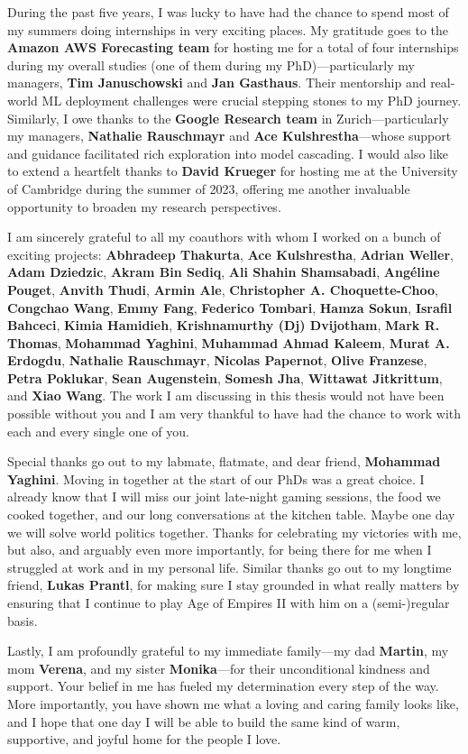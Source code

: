 During the past five years, I was lucky to have had the chance to spend most of my summers doing internships in very exciting places. My gratitude goes to the \textbf{Amazon AWS Forecasting team} for hosting me for a total of four internships during my overall studies (one of them during my PhD)—particularly my managers, \textbf{Tim Januschowski} and \textbf{Jan Gasthaus}. Their mentorship and real-world ML deployment challenges were crucial stepping stones to my PhD journey. Similarly, I owe thanks to the \textbf{Google Research team} in Zurich—particularly my managers, \textbf{Nathalie Rauschmayr} and \textbf{Ace Kulshrestha}—whose support and guidance facilitated rich exploration into model cascading. I would also like to extend a heartfelt thanks to \textbf{David Krueger} for hosting me at the University of Cambridge during the summer of 2023, offering me another invaluable opportunity to broaden my research perspectives.

I am sincerely grateful to all my coauthors with whom I worked on a bunch of exciting projects: \textbf{Abhradeep Thakurta}, \textbf{Ace Kulshrestha}, \textbf{Adrian Weller}, \textbf{Adam Dziedzic}, \textbf{Akram Bin Sediq}, \textbf{Ali Shahin Shamsabadi}, \textbf{Angéline Pouget}, \textbf{Anvith Thudi}, \textbf{Armin Ale}, \textbf{Christopher A. Choquette-Choo}, \textbf{Congchao Wang}, \textbf{Emmy Fang}, \textbf{Federico Tombari}, \textbf{Hamza Sokun}, \textbf{Israfil Bahceci}, \textbf{Kimia Hamidieh}, \textbf{Krishnamurthy (Dj) Dvijotham}, \textbf{Mark R. Thomas}, \textbf{Mohammad Yaghini}, \textbf{Muhammad Ahmad Kaleem}, \textbf{Murat A. Erdogdu}, \textbf{Nathalie Rauschmayr}, \textbf{Nicolas Papernot}, \textbf{Olive Franzese}, \textbf{Petra Poklukar}, \textbf{Sean Augenstein}, \textbf{Somesh Jha}, \textbf{Wittawat Jitkrittum}, and \textbf{Xiao Wang}. The work I am discussing in this thesis would not have been possible without you and I am very thankful to have had the chance to work with each and every single one of you. 

Special thanks go out to my labmate, flatmate, and dear friend, \textbf{Mohammad Yaghini}. Moving in together at the start of our PhDs was a great choice. I already know that I will miss our joint late-night gaming sessions, the food we cooked together, and our long conversations at the kitchen table. Maybe one day we will solve world politics together. Thanks for celebrating my victories with me, but also, and arguably even more importantly, for being there for me when I struggled at work and in my personal life. Similar thanks go out to my longtime friend, \textbf{Lukas Prantl}, for making sure I stay grounded in what really matters by ensuring that I continue to play Age of Empires II with him on a (semi-)regular basis. 

Lastly, I am profoundly grateful to my immediate family—my dad \textbf{Martin}, my mom \textbf{Verena}, and my sister \textbf{Monika}—for their unconditional kindness and support. Your belief in me has fueled my determination every step of the way. More importantly, you have shown me what a loving and caring family looks like, and I hope that one day I will be able to build the same kind of warm, supportive, and joyful home for the people I love. 